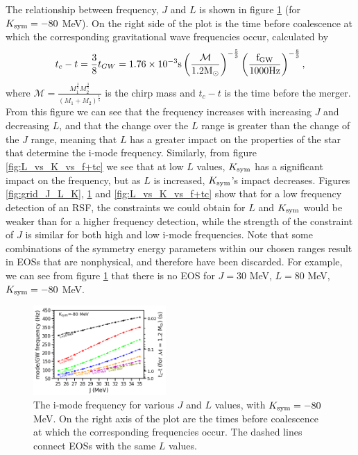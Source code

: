 \documentclass[fleqn,usenatbib]{mnras}
\begin{document}
 



The relationship between frequency, $J$ and $L$ is shown in figure \ref{fig:J_vs_L_vs_f+tc} (for $K_{\rm sym}=-80$ MeV). On the right side of the plot is the time before coalescence at which the corresponding gravitational wave frequencies occur, calculated by \citep{tsang2012resonant,blanchet2006gravitational}
\begin{align}
t_c-t=\frac{3}{8}t_{GW}=1.76\times 10^{-3}\rm{s}\left(\frac{\mathcal{M}}{1.2M_{\odot}}\right)^{-\frac{5}{3}}\left(\frac{f_{GW}}{1000 \rm{Hz}}\right)^{-\frac{8}{3}},
\label{eq:t_before_merger}
\end{align}
\noindent where $\mathcal{M}=\frac{M_1^{\frac{3}{5}}M_2^{\frac{3}{5}}}{(M_1+M_2)^{\frac{1}{5}}}$ is the chirp mass and $t_c-t$ is the time before the merger. From this figure we can see that the frequency increases with increasing $J$ and decreasing $L$, and that the change over the $L$ range is greater than the change of the $J$ range, meaning that $L$ has a greater impact on the properties of the star that determine the i-mode frequency. Similarly, from figure \ref{fig:L_vs_K_vs_f+tc} we see that at low $L$ values, $K_{\rm sym}$ has a significant impact on the frequency, but as $L$ is increased, $K_{\rm sym}$'s impact decreases. Figures \ref{fig:grid_J_L_K}, \ref{fig:J_vs_L_vs_f+tc} and \ref{fig:L_vs_K_vs_f+tc} show that for a low frequency detection of an RSF, the constraints we could obtain for $L$ and $K_{\rm sym}$ would be weaker than for a higher frequency detection, while the strength of the constraint of $J$ is similar for both high and low i-mode frequencies. Note that some combinations of the symmetry energy parameters within our chosen ranges result in EOSs that are nonphysical, and therefore have been discarded. For example, we can see from figure \ref{fig:J_vs_L_vs_f+tc} that there is no EOS for $J=30$ MeV, $L=80$ MeV, $K_{\rm sym}=-80$ MeV.


\begin{figure}
\centering
\includegraphics[width=0.45\textwidth,angle=0]{J_L_f_tc_K-80.png}
\caption{The i-mode frequency for various $J$ and $L$ values, with $K_{\rm sym}=-80$ MeV. On the right axis of the plot are the times before coalescence at which the corresponding frequencies occur. The dashed lines connect EOSs with the same $L$ values.}
\label{fig:J_vs_L_vs_f+tc}
\end{figure}
\end{document}

